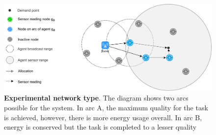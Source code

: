 \begin{figure}[ht]
	\centering
	\includegraphics[width=0.9\linewidth]{network-types}
	\caption{\textbf{Experimental network type}. The diagram shows two arcs possible for the system. In arc A, the maximum quality for the task is achieved, however, there is more energy usage overall. In arc B, energy is conserved but the task is completed to a lesser quality}
	\label{fig:network-types}
\end{figure}

